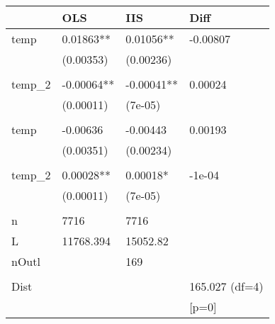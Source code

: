 \begin{table}[ht]
\centering
\begin{tabular}{llll}
  \hline
 & OLS & IIS & Diff \\ 
  \hline
temp & 0.01863** & 0.01056** & -0.00807 \\ 
   & (0.00353) & (0.00236) &  \\ 
   &  &  &  \\ 
  temp\_2 & -0.00064** & -0.00041** & 0.00024 \\ 
   & (0.00011) & (7e-05) &  \\ 
   &  &  &  \\ 
  temp & -0.00636 & -0.00443 & 0.00193 \\ 
   & (0.00351) & (0.00234) &  \\ 
   &  &  &  \\ 
  temp\_2 & 0.00028** & 0.00018* & -1e-04 \\ 
   & (0.00011) & (7e-05) &  \\ 
   &  &  &  \\ 
  n & 7716 & 7716 &  \\ 
  L & 11768.394 & 15052.82 &  \\ 
  nOutl &  & 169 &  \\ 
   &  &  &  \\ 
  Dist &  &  & 165.027 (df=4) \\ 
   &  &  & [p=0] \\ 
   \hline
\end{tabular}
\end{table}
